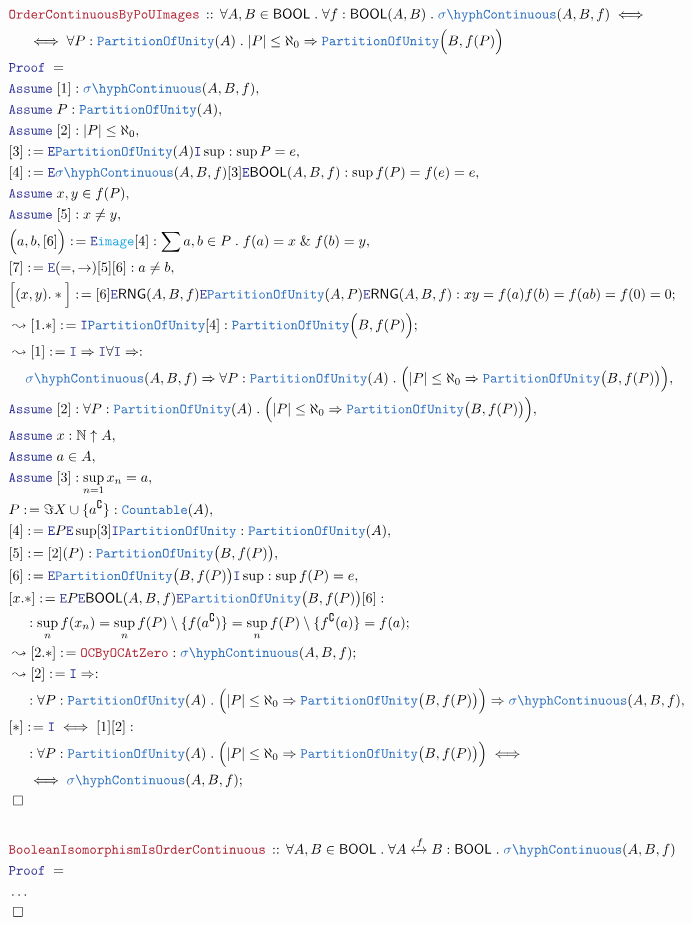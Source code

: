 \documentclass[12pt]{scrartcl}
\newcommand{\TYPE}[1]{\textcolor{NavyBlue}{\mathtt{#1}}}
\newcommand{\FUNC}[1]{\textcolor{Cerulean}{\mathtt{#1}}}
\newcommand{\LOGIC}[1]{\textcolor{Blue}{\mathtt{#1}}}
\newcommand{\THM}[1]{\textcolor{Maroon}{\mathtt{#1}}}
\renewcommand{\.}{\; . \;}
\newcommand{\de}{: \kern 0.1pc =}
\newcommand{\Theorem}[2]{& \THM{#1} \, :: \, #2 \\ & \Proof = \\ }
\newcommand{\NewLine}{\\ & \kern 1pc}
\newcommand{\Page}[1]{ \begin{align*} #1 \end{align*}   }
\newcommand{\NoProof}{ & \ldots \\ \EndProof}
\renewcommand{\And}{\; \& \;}
\newcommand{\Imply}{\Rightarrow}
\newcommand{\Intro}{\LOGIC{I}}
\newcommand{\Elim}{\LOGIC{E}}
\newcommand{\Nat}{\mathbb{N} }
\newcommand{\ToIso}{\xleftrightarrow}
\renewcommand{\c}{\complement}
\newcommand{\Say}[3]{& #1 \de #2 : #3, \\}
\newcommand{\Conclude}[3]{& #1 \de #2 : #3; \\}
\newcommand{\Derive}[3]{& \leadsto #1 \de #2 : #3, \\}
\newcommand{\DeriveConclude}[3]{& \leadsto #1 \de #2 : #3 ; \\}
\newcommand{\Assume}[2]{& \LOGIC{Assume} \; #1 : #2, \\}
\newcommand{\AssumeIn}[2]{& \LOGIC{Assume} \; #1 \in #2, \\}
\newcommand{\QED}{\; \square}
\newcommand{\EndProof}{& \QED \\}
\newcommand{\Proof}{\LOGIC{Proof} \; }
\newcommand{\RNG}{\mathsf{RNG}}
\newcommand{\PoU}{\TYPE{PartitionOfUnity}}
\newcommand{\sC}{\TYPE{\sigma\hyph Continuous}}
\newcommand{\BOOL}{\mathsf{BOOL}}
\begin{document}
\Page{
	\Theorem{OrderContinuousByPoUImages}
	{
		\forall A,B \in \BOOL \.
		\forall f : \BOOL(A,B) \.
		\sC(A,B,f)
		\iff 
		\NewLine
		\iff
		\forall P : \PoU(A) \. 
		|P| \le \aleph_0 \Imply
		\PoU\Big(B, f(P) \Big)
	}
	\Assume{[1] }{\sC(A,B,f)}
	\Assume{P}{\PoU(A)}
	\Assume{[2]}{|P| \le \aleph_0}
	\Say{[3]}{\Elim \PoU(A) \Intro \sup}
	{
		\sup P = e
	}
	\Say{[4]}{\Elim \sC(A,B,f)[3] \Elim \BOOL(A,B,f)}{ \sup f(P) = f(e) = e   }
	\AssumeIn{x,y}{f(P)}
	\Assume{[5]}{x \neq y}
	\Say{\Big(a,b,[6]\Big)}{\Elim \FUNC{image}[4]}
	{
		\sum a,b \in P \.  f(a) = x \And f(b) = y 
	}
	\Say{[7]}{\Elim (=,\to)[5][6]}{a \neq b}
	\Conclude{\Big[(x,y).*\Big]}{
		[6]
		\Elim \RNG(A,B,f)
		\Elim \PoU(A,P)
		\Elim \RNG(A,B,f)
	}
	{  
		xy = 
		f(a)f(b) = 
		f(ab) =
		f(0) =
		0
	}
	\DeriveConclude{[1.*]}{\Intro \PoU [4]}
	{
		\PoU\Big( B, f(P)  \Big)
	}
	\Derive{[1]}{\Intro \Imply \Intro \forall \Intro \Imply}
	{
		\NewLine
		\sC(A,B,f)  \Imply
		\forall P : \PoU(A) \.
		\Big(
			|P| \le \aleph_0 
			\Imply 
			\PoU\big(B, f(P)\big)
		\Big)
	}
	\Assume{[2]}
	{
		\forall P : \PoU(A) \.
		\Big(
			|P| \le \aleph_0 
			\Imply 
			\PoU\big(B, f(P)\big)
		\Big)	
	}
	\Assume{x}{\Nat \uparrow A}
	\AssumeIn{a}{A}
	\Assume{[3]}{\sup_{n=1} x_n = a}
	\Say{P}{ \Im X \cup \{a^\c\}}{\TYPE{Countable}(A)}
	\Say{[4]}{\Elim P \Elim \sup [3] \Intro \PoU}{\PoU(A)}
	\Say{[5]}{[2](P)}{\PoU\big(B, f(P) \big)}
	\Say{[6]}{\Elim \PoU\big(B, f(P) \big) \Intro \sup}
	{
		\sup f(P) = e
	}
	\Conclude{[x.*]}{ \Elim P \Elim \BOOL(A,B,f)\Elim \PoU\big(B,f(P)\big)[6]}
	{
		\NewLine :
		\sup_n f(x_n) = 
		\sup_n f(P) \setminus \{ f(a^\c) \} =
		\sup_n f(P) \setminus \{ f^\c(a) \} = 
		f(a)
	}
	\DeriveConclude{[2.*]}{\THM{OCByOCAtZero}}
	{
		\sC(A,B,f)
	}
	\Derive{[2]}{\Intro \Imply}
	{
		\NewLine :
		\forall P : \PoU(A) \.
		\Big(
			|P| \le \aleph_0 
			\Imply 
			\PoU\big(B, f(P)\big)
		\Big)	
		\Imply
		\sC(A,B,f)
	}
	\Conclude{[*]}{\Intro \iff [1][2]}
	{
		\NewLine : 
		\forall P : \PoU(A) \.
		\Big(
			|P| \le \aleph_0 
			\Imply 
			\PoU\big(B, f(P)\big)
		\Big)	
		\iff
		\NewLine
		\iff
		\sC(A,B,f)
	}
	\EndProof
	\\
	\Theorem{BooleanIsomorphismIsOrderContinuous}
	{
		\forall A,B \in \BOOL \.
		\forall A \ToIso{f} B : \BOOL \.
		\sC(A,B,f)
	}
	\NoProof
}
\end{document}
